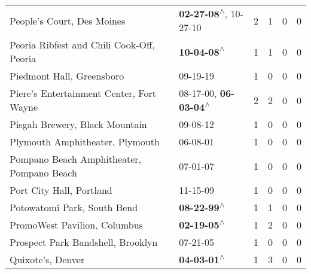 \begin{supertabular}{p{0.4\textwidth}p{0.3\textwidth}p{0.05\textwidth}p{0.05\textwidth}p{0.05\textwidth}p{0.05\textwidth}}
                                                   People's Court, Des Moines &                     \textbf{02-27-08\textsuperscript{$\wedge$}}, 10-27-10\textsuperscript{} &  2 &  1 &  0 &  0 \\
                                    Peoria Ribfest and Chili Cook-Off, Peoria &                                                 \textbf{10-04-08\textsuperscript{$\wedge$}} &  1 &  1 &  0 &  0 \\
                                                    Piedmont Hall, Greensboro &                                                                  09-19-19\textsuperscript{} &  1 &  0 &  0 &  0 \\
                                     Piere's Entertainment Center, Fort Wayne &                     08-17-00\textsuperscript{}, \textbf{06-03-04\textsuperscript{$\wedge$}} &  2 &  2 &  0 &  0 \\
                                               Pisgah Brewery, Black Mountain &                                                                  09-08-12\textsuperscript{} &  1 &  0 &  0 &  0 \\
                                              Plymouth Amphitheater, Plymouth &                                                                  06-08-01\textsuperscript{} &  1 &  0 &  0 &  0 \\
                                    Pompano Beach Amphitheater, Pompano Beach &                                                                  07-01-07\textsuperscript{} &  1 &  0 &  0 &  0 \\
                                                     Port City Hall, Portland &                                                                  11-15-09\textsuperscript{} &  1 &  0 &  0 &  0 \\
                                                  Potowatomi Park, South Bend &                                                 \textbf{08-22-99\textsuperscript{$\wedge$}} &  1 &  1 &  0 &  0 \\
                                                 PromoWest Pavilion, Columbus &                                                 \textbf{02-19-05\textsuperscript{$\wedge$}} &  1 &  2 &  0 &  0 \\
                                            Prospect Park Bandshell, Brooklyn &                                                                  07-21-05\textsuperscript{} &  1 &  0 &  0 &  0 \\
                                                            Quixote's, Denver &                                                 \textbf{04-03-01\textsuperscript{$\wedge$}} &  1 &  3 &  0 &  0 \\

\end{supertabular}
